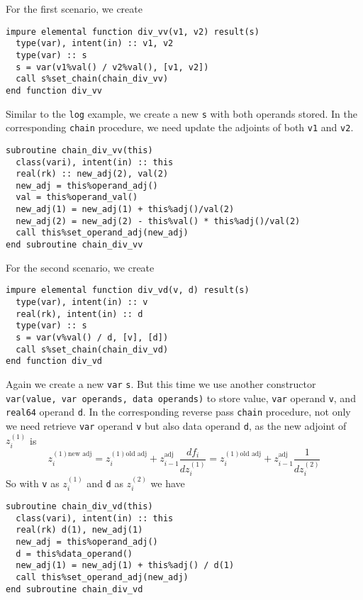 \documentclass[12pt, reqno, oneside]{amsbook}
\begin{document}
For the first scenario, we create
\begin{verbatim}
impure elemental function div_vv(v1, v2) result(s)
  type(var), intent(in) :: v1, v2
  type(var) :: s
  s = var(v1%val() / v2%val(), [v1, v2])
  call s%set_chain(chain_div_vv)
end function div_vv
\end{verbatim}
Similar to the \texttt{log} example, we create a new \texttt{s} with both operands
stored. In the corresponding \texttt{chain} procedure, we need update
the adjoints of both \texttt{v1} and \texttt{v2}.
\begin{verbatim}
subroutine chain_div_vv(this)
  class(vari), intent(in) :: this
  real(rk) :: new_adj(2), val(2)
  new_adj = this%operand_adj()
  val = this%operand_val()
  new_adj(1) = new_adj(1) + this%adj()/val(2)
  new_adj(2) = new_adj(2) - this%val() * this%adj()/val(2)
  call this%set_operand_adj(new_adj)
end subroutine chain_div_vv
\end{verbatim}

For the second scenario, we create
\begin{verbatim}
impure elemental function div_vd(v, d) result(s)
  type(var), intent(in) :: v
  real(rk), intent(in) :: d
  type(var) :: s
  s = var(v%val() / d, [v], [d])
  call s%set_chain(chain_div_vd)
end function div_vd
\end{verbatim}
Again we create a new \texttt{var} \texttt{s}. But this time
we use another constructor \texttt{var(value, var operands, data
operands)} to store value, \texttt{var} operand \texttt{v}, and \texttt{real64}
operand \texttt{d}. In the corresponding reverse pass \texttt{chain} procedure, not
      only we need retrieve \texttt{var} operand \texttt{v} but also data operand
      \texttt{d}, as the new adjoint of \(z_i^{(1)}\) is
\begin{equation*}
z_i^{(1)\text{new adj}} = z_i^{(1)\text{old adj}} + z_{i-1}^{\text{adj}}\frac{df_i}{dz_i^{(1)}}
= z_i^{(1)\text{old adj}} + z_{i-1}^{\text{adj}}\frac{1}{dz_i^{(2)}}
\end{equation*}      
So with \texttt{v} as \(z_i^{(1)}\) and \texttt{d} as \(z_i^{(2)}\) we have
\begin{verbatim}
subroutine chain_div_vd(this)
  class(vari), intent(in) :: this
  real(rk) d(1), new_adj(1)
  new_adj = this%operand_adj()
  d = this%data_operand()
  new_adj(1) = new_adj(1) + this%adj() / d(1)
  call this%set_operand_adj(new_adj)
end subroutine chain_div_vd
\end{verbatim}
\end{document}
